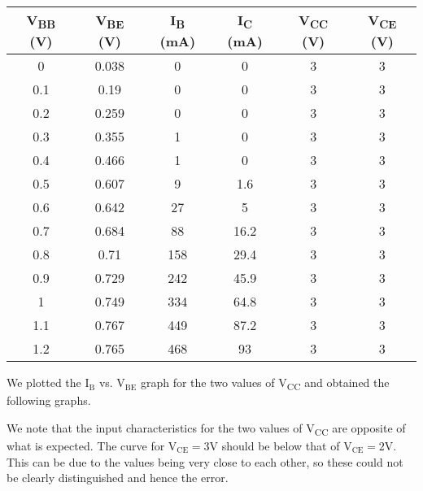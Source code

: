 \documentclass{scrartcl}
\begin{document}
    \begin{table}[H]
        \centering
        \begin{tabular}{|c|c|c|c|c|c|}
        \hline
        \textbf{V\textsubscript{BB} (V)}  & \textbf{V\textsubscript{BE} (V)} &\textbf{I\textsubscript{B} (mA)} & \textbf{I\textsubscript{C} (mA)} & \textbf{V\textsubscript{CC} (V)} &  \textbf{V\textsubscript{CE} (V)}  \\
    \hline
        0     & 0.038 & 0            & 0            & 3     & 3             \\ \hline
        0.1   & 0.19  & 0            & 0            & 3     & 3             \\ \hline
        0.2   & 0.259 & 0            & 0            & 3     & 3             \\ \hline
        0.3   & 0.355 & 1            & 0            & 3     & 3             \\ \hline
        0.4   & 0.466 & 1            & 0            & 3     & 3             \\ \hline
        0.5   & 0.607 & 9            & 1.6          & 3     & 3             \\ \hline
        0.6   & 0.642 & 27           & 5            & 3     & 3             \\ \hline
        0.7   & 0.684 & 88           & 16.2         & 3     & 3             \\ \hline
        0.8   & 0.71  & 158          & 29.4         & 3     & 3             \\ \hline
        0.9   & 0.729 & 242          & 45.9         & 3     & 3             \\ \hline
        1     & 0.749 & 334          & 64.8         & 3     & 3             \\ \hline
        1.1   & 0.767 & 449          & 87.2         & 3     & 3             \\ \hline
        1.2   & 0.765 & 468          & 93           & 3     & 3             \\
        \hline           
        \end{tabular}
        \end{table}

We plotted the $\mathrm{I_B}$ vs. $\mathrm{V_{BE}}$ graph for the two values of V\textsubscript{CC} and obtained the following graphs.

\noindent
We note that the input characteristics for the two values of V\textsubscript{CC} are opposite of what is expected. The curve for $\mathrm{V_{CE}=3V}$ should be below that of $\mathrm{V_{CE}=2V}$. This can be due to the values being very close to each other, so these could not be clearly distinguished and hence the error.
\end{document}
